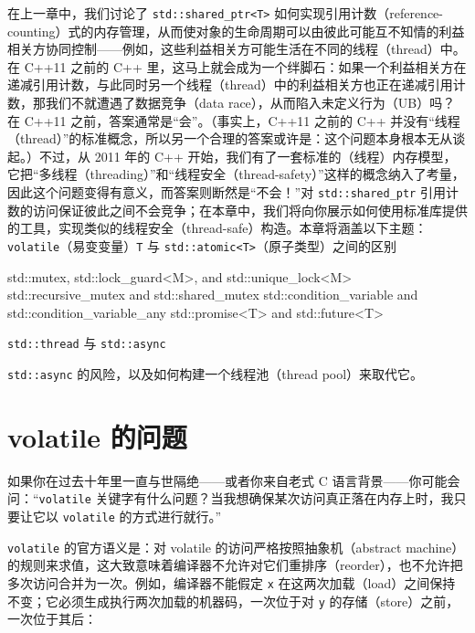 在上一章中，我们讨论了 \texttt{std::\allowbreak{}shared\_\allowbreak{}ptr<\allowbreak{}T>\allowbreak{}} 如何实现引用计数（reference-counting）式的内存管理，从而使对象的生命周期可以由彼此可能互不知情的利益相关方协同控制——例如，这些利益相关方可能生活在不同的线程（thread）中。在 C++11 之前的 C++ 里，这马上就会成为一个绊脚石：如果一个利益相关方在递减引用计数，与此同时另一个线程（thread）中的利益相关方也正在递减引用计数，那我们不就遭遇了数据竞争（data race），从而陷入未定义行为（UB）吗？在 C++11 之前，答案通常是“会”。（事实上，C++11 之前的 C++ 并没有“线程（thread）”的标准概念，所以另一个合理的答案或许是：这个问题本身根本无从谈起。）不过，从 2011 年的 C++ 开始，我们有了一套标准的（线程）内存模型，它把“多线程（threading）”和“线程安全（thread-safety）”这样的概念纳入了考量，因此这个问题变得有意义，而答案则断然是“不会！”对 \texttt{std::\allowbreak{}shared\_\allowbreak{}ptr} 引用计数的访问保证彼此之间不会竞争；在本章中，我们将向你展示如何使用标准库提供的工具，实现类似的线程安全（thread-safe）构造。本章将涵盖以下主题：\texttt{volatile}（易变变量）\texttt{T} 与 \texttt{std::\allowbreak{}atomic<\allowbreak{}T>\allowbreak{}}（原子类型）之间的区别

\begin{codebox}[cpp]
std::mutex, std::lock_guard<M>, and std::unique_lock<M>
std::recursive_mutex and std::shared_mutex
std::condition_variable and std::condition_variable_any
std::promise<T> and std::future<T>
\end{codebox}

\texttt{std::\allowbreak{}thread} 与 \texttt{std::\allowbreak{}async}

\texttt{std::\allowbreak{}async} 的风险，以及如何构建一个线程池（thread pool）来取代它。

\section{volatile 的问题}

如果你在过去十年里一直与世隔绝——或者你来自老式 C 语言背景——你可能会问：“\texttt{volatile} 关键字有什么问题？当我想确保某次访问真正落在内存上时，我只要让它以 \texttt{volatile} 的方式进行就行。”

\texttt{volatile} 的官方语义是：对 volatile 的访问严格按照抽象机（abstract machine）的规则来求值，这大致意味着编译器不允许对它们重排序（reorder），也不允许把多次访问合并为一次。例如，编译器不能假定 \texttt{x} 在这两次加载（load）之间保持不变；它必须生成执行两次加载的机器码，一次位于对 \texttt{y} 的存储（store）之前，一次位于其后：

